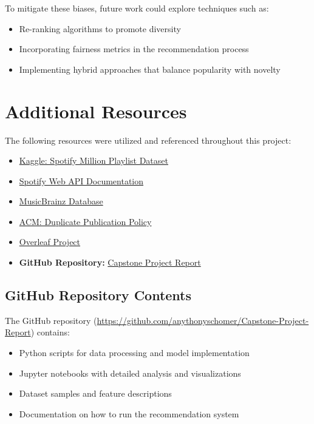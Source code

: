 \documentclass[runningheads]{llncs}
\begin{document}
To mitigate these biases, future work could explore techniques such as:
\begin{itemize}
    \item Re-ranking algorithms to promote diversity
    \item Incorporating fairness metrics in the recommendation process
    \item Implementing hybrid approaches that balance popularity with novelty
\end{itemize}

\section{Additional Resources}
The following resources were utilized and referenced throughout this project:

\begin{itemize}
    \item \href{https://www.kaggle.com/datasets/shubhendra/million-playlist-dataset}{Kaggle: Spotify Million Playlist Dataset}
    \item \href{https://developer.spotify.com/documentation/web-api/}{Spotify Web API Documentation}
    \item \href{https://musicbrainz.org/}{MusicBrainz Database}
    \item \href{https://www.acm.org/publications/policies/duplicate-publication}{ACM: Duplicate Publication Policy}
    \item \href{https://www.overleaf.com/project}{Overleaf Project}
    \item \textbf{GitHub Repository:} \href{https://github.com/anythonyschomer/Capstone-Project-Report}{Capstone Project Report}
\end{itemize}

\subsection{GitHub Repository Contents}
The GitHub repository (\url{https://github.com/anythonyschomer/Capstone-Project-Report}) contains:
\begin{itemize}
    \item Python scripts for data processing and model implementation
    \item Jupyter notebooks with detailed analysis and visualizations
    \item Dataset samples and feature descriptions
    \item Documentation on how to run the recommendation system
\end{itemize}
\end{document}
